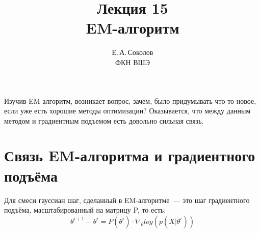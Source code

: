 \documentclass[12pt,fleqn]{article}
\begin{document}
\title{Лекция 15\\EM-алгоритм}
\author{Е.\,А.\,Соколов\\ФКН ВШЭ}
\maketitle


Изучив EM-алгоритм, возникает вопрос, зачем, было придумывать что-то новое, если уже есть хорошие методы оптимизации? Оказывается, что между данным методом и градиентным подъемом есть довольно сильная связь.

\section{Связь EM-алгоритма и градиентного подъёма}
\begin{vkTheorem}
    Для смеси гауссиан шаг, сделанный в EM-алгоритме~--- это шаг градиентного подъёма, масштабированный на матрицу P, то есть:
    \begin{equation}
    \label{eq:form}
    \theta^{i+1} - \theta^{i}= P(\theta^i)\cdot\nabla_{\theta} log(p(X|\theta^i))
    \end{equation}
\end{vkTheorem}
\end{document}
